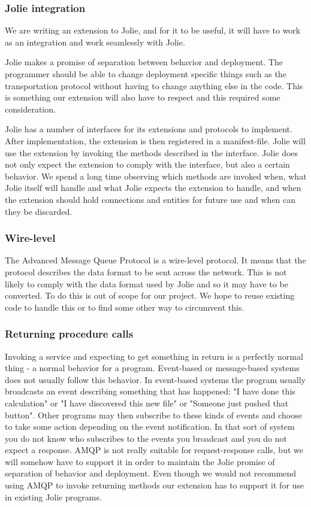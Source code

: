 \subsubsection{Jolie integration}
\label{subsubsec:Jolie integration}
We are writing an extension to Jolie, and for it to be useful, it will have to work as an integration and work seamlessly with Jolie.

Jolie makes a promise of separation between behavior and deployment. The programmer should be able to change deployment specific things such as the transportation protocol without having to change anything else in the code. This is something our extension will also have to respect and this required some consideration.

Jolie has a number of interfaces for its extensions and protocols to implement. After implementation, the extension is then registered in a manifest-file. Jolie will use the extension by invoking the methods described in the interface. Jolie does not only expect the extension to comply with the interface, but also a certain behavior. We spend a long time observing which methods are invoked when, what Jolie itself will handle and what Jolie expects the extension to handle, and when the extension should hold connections and entities for future use and when can they be discarded.
\subsubsection{Wire-level}
The Advanced Message Queue Protocol is a wire-level protocol. It means that the protocol describes the data format to be sent across the network. This is not likely to comply with the data format used by Jolie and so it may have to be converted. To do this is out of scope for our project. We hope to reuse existing code to handle this or to find some other way to circumvent this.
\subsubsection{Returning procedure calls}
Invoking a service and expecting to get something in return is a perfectly normal thing - a normal behavior for a program. Event-based or message-based systems does not usually follow this behavior. In event-based systems the program usually broadcasts an event describing something that has happened: "I have done this calculation" or "I have discovered this new file" or "Someone just pushed that button". Other programs may then subscribe to these kinds of events and choose to take some action depending on the event notification. In that sort of system you do not know who subscribes to the events you broadcast and you do not expect a response. AMQP is not really suitable for request-response calls, but we will somehow have to support it in order to maintain the Jolie promise of separation of behavior and deployment. Even though we would not recommend using AMQP to invoke returning methods our extension has to support it for use in existing Jolie programs.
